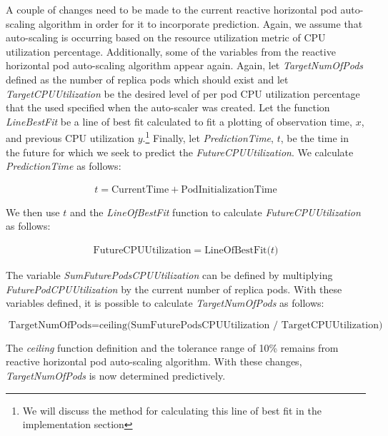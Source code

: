A couple of changes need to be made to the current reactive horizontal pod
auto-scaling algorithm in order for it to incorporate prediction. Again, we
assume that auto-scaling is occurring based on the resource utilization metric of
CPU utilization percentage. Additionally, some of the variables from the
reactive horizontal pod auto-scaling algorithm appear again. Again, let
\textit{TargetNumOfPods} defined as the number of replica pods which should
exist and let \textit{TargetCPUUtilization} be the desired level of per pod CPU
utilization percentage that the used specified when the auto-scaler was created.
Let the function \textit{LineBestFit} be a line of best fit calculated
to fit a plotting of observation time, $x$, and previous CPU utilization
$y$.\footnote{We will discuss the method for calculating this line of best fit
in the implementation section} Finally, let
\textit{PredictionTime}, $t$, be the time in the future for
which we seek to predict the \textit{FutureCPUUtilization}. We calculate
\textit{PredictionTime} as follows:

\begin{align*}
  t = \mbox{CurrentTime} + \mbox{{PodInitializationTime}}
\end{align*}

We then use $t$ and the \textit{LineOfBestFit} function to
calculate \textit{FutureCPUUtilization} as follows:

\begin{align*}
  \mbox{FutureCPUUtilization} = \mbox{LineOfBestFit($t$)}
\end{align*}

The variable \textit{SumFuturePodsCPUUtilization} can be defined by multiplying
\textit{FuturePodCPUUtilization} by the current number of replica pods.
With these variables defined, it is possible to calculate
\textit{TargetNumOfPods} as follows:

\[ \mbox{TargetNumOfPods} = \mbox{ceiling(SumFuturePodsCPUUtilization /
TargetCPUUtilization)} \]

The \textit{ceiling} function definition and the tolerance range of 10\% remains from
reactive horizontal pod auto-scaling algorithm. With these changes,
\textit{TargetNumOfPods} is now determined predictively.
